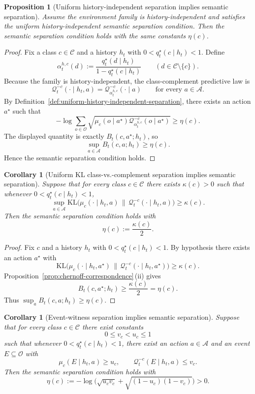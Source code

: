 \documentclass[11pt]{article}
\newtheorem{proposition}[theorem]{Proposition}
\newtheorem{corollary}[theorem]{Corollary}
\theoremstyle{definition}
\theoremstyle{remark}
\newcommand{\Acal}{\mathcal{A}}
\newcommand{\Ccal}{\mathcal{C}}
\newcommand{\Ocal}{\mathcal{O}}
\newcommand{\Qcal}{\mathcal{Q}}
\newcommand{\KL}{\mathrm{KL}}
\begin{document}
\begin{proposition}[Uniform history-independent separation implies semantic separation]
\label{prop:uniform-history-independent-implies-semantic}
Assume the environment family is history-independent and satisfies the uniform history-independent semantic separation condition. Then the semantic separation condition holds with the same constants $\eta(c)$.
\end{proposition}

\begin{proof}
Fix a class $c\in\Ccal$ and a history $h_t$ with $0<q_t^\star(c\mid h_t)<1$. Define
\[
\alpha_t^{h,c}(d):=
\frac{q_t^\star(d\mid h_t)}{1-q_t^\star(c\mid h_t)}
\qquad
(d\in\Ccal\setminus\{c\}).
\]
Because the family is history-independent, the class-complement predictive law is
\[
\Qcal_t^{-c}(\cdot\mid h_t,a)=\Qcal_{\alpha_t^{h,c}}^{-c}(\cdot\mid a)
\qquad\text{for every }a\in\Acal.
\]
By Definition~\ref{def:uniform-history-independent-separation}, there exists an action $a^\star$ such that
\[
-\log\sum_{o\in\Ocal}\sqrt{\mu_c(o\mid a^\star)\Qcal_{\alpha_t^{h,c}}^{-c}(o\mid a^\star)}
\ge \eta(c).
\]
The displayed quantity is exactly $B_t(c,a^\star;h_t)$, so
\[
\sup_{a\in\Acal}B_t(c,a;h_t)\ge \eta(c).
\]
Hence the semantic separation condition holds.
\end{proof}

\begin{corollary}[Uniform KL class-vs.-complement separation implies semantic separation]
\label{cor:kl-implies-semantic-separation}
Suppose that for every class $c\in\Ccal$ there exists $\kappa(c)>0$ such that whenever $0<q_t^\star(c\mid h_t)<1$,
\[
\sup_{a\in\Acal}
\KL\!\bigl(\mu_c(\cdot\mid h_t,a)\,\|\,\Qcal_t^{-c}(\cdot\mid h_t,a)\bigr)
\ge \kappa(c).
\]
Then the semantic separation condition holds with
\[
\eta(c):=\frac{\kappa(c)}{2}.
\]
\end{corollary}

\begin{proof}
Fix $c$ and a history $h_t$ with $0<q_t^\star(c\mid h_t)<1$. By hypothesis there exists an action $a^\star$ with
\[
\KL\!\bigl(\mu_c(\cdot\mid h_t,a^\star)\,\|\,\Qcal_t^{-c}(\cdot\mid h_t,a^\star)\bigr)\ge \kappa(c).
\]
Proposition~\ref{prop:chernoff-correspondence}\,\textup{(ii)} gives
\[
B_t(c,a^\star;h_t)\ge \frac{\kappa(c)}{2}=\eta(c).
\]
Thus $\sup_a B_t(c,a;h_t)\ge \eta(c)$.
\end{proof}

\begin{corollary}[Event-witness separation implies semantic separation]
\label{cor:event-witness-implies-semantic-separation}
Suppose that for every class $c\in\Ccal$ there exist constants
\[
0\le v_c<u_c\le 1
\]
such that whenever $0<q_t^\star(c\mid h_t)<1$, there exist an action $a\in\Acal$ and an event $E\subseteq\Ocal$ with
\[
\mu_c(E\mid h_t,a)\ge u_c,
\qquad
\Qcal_t^{-c}(E\mid h_t,a)\le v_c.
\]
Then the semantic separation condition holds with
\[
\eta(c):=-\log\!\bigl(\sqrt{u_cv_c}+\sqrt{(1-u_c)(1-v_c)}\bigr)>0.
\]
\end{corollary}
\end{document}
